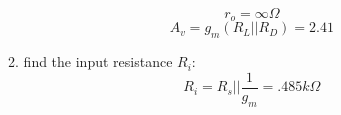 \documentclass{article}
\begin{document}
\begin{enumerate}
\begin{enumerate}
\begin{equation}
        \end{equation}
        \begin{equation}
            r_o = \infty\Omega
        \end{equation}
        \begin{equation}
            A_v = g_m(R_L||R_D) = \boxed{2.41}
        \end{equation}
        \item find the input resistance $R_i$:
        \begin{equation}
            R_i = R_s || \frac{1}{g_m} = \boxed{.485k\Omega}
        \end{equation}
    \end{enumerate}
\end{enumerate}
\end{document}
